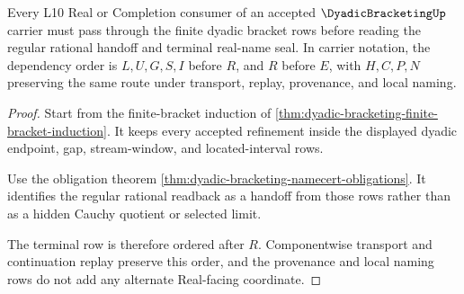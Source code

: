 \begin{theorem}
\label{thm:dyadic-bracketing-l10-real-name-handoff}
Every L10 Real or Completion consumer of an accepted $\DyadicBracketingUp$ carrier must pass through the finite dyadic bracket rows before reading the regular rational handoff and terminal real-name seal. In carrier notation, the dependency order is $L,U,G,S,I$ before $R$, and $R$ before $E$, with $H,C,P,N$ preserving the same route under transport, replay, provenance, and local naming.
\end{theorem}
\begin{proof}
Start from the finite-bracket induction of \autoref{thm:dyadic-bracketing-finite-bracket-induction}. It keeps every accepted refinement inside the displayed dyadic endpoint, gap, stream-window, and located-interval rows.

Use the obligation theorem \autoref{thm:dyadic-bracketing-namecert-obligations}. It identifies the regular rational readback as a handoff from those rows rather than as a hidden Cauchy quotient or selected limit.

The terminal row is therefore ordered after $R$. Componentwise transport and continuation replay preserve this order, and the provenance and local naming rows do not add any alternate Real-facing coordinate.
\end{proof}




